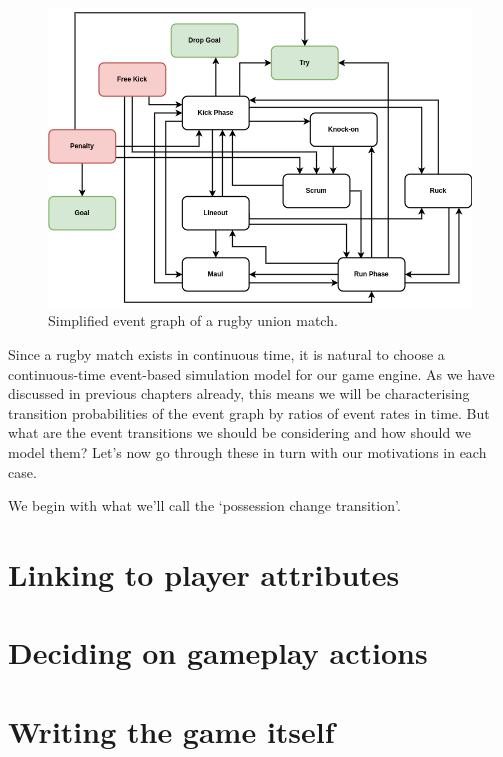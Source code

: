 \begin{figure}[h]
\includegraphics[width=14cm]{images/trywizard-event-graph.drawio.png}
\caption{Simplified event graph of a rugby union match.}
\label{fig:event-graph}
\end{figure}

Since a rugby match exists in continuous time, it is natural to choose a continuous-time event-based simulation model for our game engine. As we have discussed in previous chapters already, this means we will be characterising transition probabilities of the event graph by ratios of event rates in time. But what are the event transitions we should be considering and how should we model them? Let's now go through these in turn with our motivations in each case.

We begin with what we'll call the `possession change transition'. 


\section{\sffamily Linking to player attributes}

\section{\sffamily Deciding on gameplay actions}

\section{\sffamily Writing the game itself}